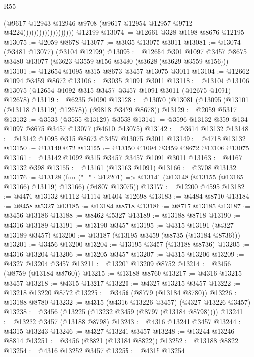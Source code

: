 \begin{lexlean}{R55}
\begin{coremodule}
                                      (@9617
                                        @12943
                                        @12946
                                        @9708
                                        (@9617 @12954 @12957 @9712 @4224)))))))))))))))))))
    @12199
@13074 := @12661 @328 @1098 @8676 @12195
@13075 := @2059 @8678
@13077 := @3035 @13075 @3011
@13081 := @13074 (@3481 @13077) (@3104 @12199)
@13095 := @12654
    @301
    @1097
    @3457
    @8675
    @3480
    @13077
    (@3623 @3559 @156 @3480 (@3628 (@3629 @3559 @156)))
@13101 := @12654 @1095 @315 @8673 @3457 @13075 @3011
@13104 := @12662 @1094 @3459 @8672
@13106 := @3035 @1091 @3011
@13118 := @13104 @13106 @13075 (@12654 @1092 @315 @3457 @3457 @1091 @3011 (@12675 @1091) @12678)
@13119 := @6235 @1090
@13128 := @13070 (@13081 (@13095 (@13101 (@13118 @13119) @12678)) (@9818 @3479 @8678))
@13129 := @2059 @5317
@13132 := @3533 (@3555 @13129) @3558
@13141 := @3596 @13132 @359 @134 @1097 @8675 @3457 @13077 (@4610 @13075)
@13142 := @3614 @13132
@13148 := @13142 @1095 @315 @8673 @3457 @13075 @3011
@13149 := @4718 @13132
@13150 := @13149 @72
@13155 := @13150 @1094 @3459 @8672 @13106 @13075
@13161 := @13142 @1092 @315 @3457 @3457 @1091 @3011
@13163 := @4167 @13132 @398
@13165 := @13161 (@13163 @1091)
@13166 := @3708 @13132
@13176 := @13128
    (fun ("_" : @12201) => @13141 (@13148 (@13155 (@13165 @13166) @13119) @13166) (@4807 @13075))
@13177 := @12200 @4595
@13182 := @4470 @13132 @1112 @1114 @1404 @12698
@13183 := @4484 @8710
@13184 := @8458 @5327
@13185 := @13184 @8718
@13186 := @8717 @13185
@13187 := @3456 @13186
@13188 := @8462 @5327
@13189 := @13188 @8718
@13190 := @4316 @13189
@13191 := @13190 @3457
@13195 := @4315 @13191 (@4327 @13189 @3457)
@13200 := @13187 (@13195 @3459 (@8735 (@13184 @8736)))
@13201 := @3456 @13200
@13204 := @13195 @3457 (@13188 @8736)
@13205 := @4316 @13204
@13206 := @13205 @3457
@13207 := @4315 @13206
@13209 := @4327 @13204 @3457
@13211 := @13207 @13209 @8752
@13214 := @3456 (@8759 (@13184 @8760))
@13215 := @13188 @8760
@13217 := @4316 @13215 @3457
@13218 := @4315 @13217
@13220 := @4327 @13215 @3457
@13222 := @13218 @13220 @8772
@13225 := @3456 (@8779 (@13184 @8780))
@13226 := @13188 @8780
@13232 := @4315 (@4316 @13226 @3457) (@4327 @13226 @3457)
@13238 := @3456 (@13225 (@13232 @3459 (@8797 (@13184 @8798))))
@13241 := @13232 @3457 (@13188 @8798)
@13243 := @4316 @13241 @3457
@13244 := @4315 @13243
@13246 := @4327 @13241 @3457
@13248 := @13244 @13246 @8814
@13251 := @3456 (@8821 (@13184 @8822))
@13252 := @13188 @8822
@13254 := @4316 @13252 @3457
@13255 := @4315 @13254

\end{coremodule}
\end{lexlean}
